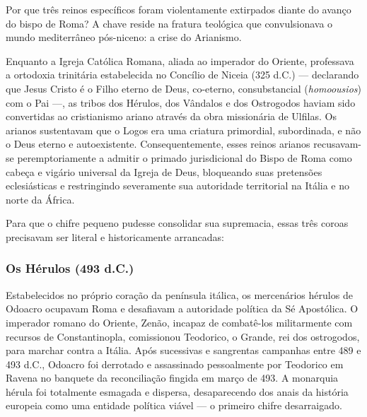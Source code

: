 \documentclass[11pt,a4paper,openany]{book}
\begin{document}
Por que três reinos específicos foram violentamente extirpados diante do avanço do bispo de Roma? A chave reside na fratura teológica que convulsionava o mundo mediterrâneo pós-niceno: a crise do Arianismo.

Enquanto a Igreja Católica Romana, aliada ao imperador do Oriente, professava a ortodoxia trinitária estabelecida no Concílio de Niceia (325 d.C.) — declarando que Jesus Cristo é o Filho eterno de Deus, co-eterno, consubstancial (\textit{homoousios}) com o Pai —, as tribos dos Hérulos, dos Vândalos e dos Ostrogodos haviam sido convertidas ao cristianismo ariano através da obra missionária de Ulfilas. Os arianos sustentavam que o Logos era uma criatura primordial, subordinada, e não o Deus eterno e autoexistente. Consequentemente, esses reinos arianos recusavam-se peremptoriamente a admitir o primado jurisdicional do Bispo de Roma como cabeça e vigário universal da Igreja de Deus, bloqueando suas pretensões eclesiásticas e restringindo severamente sua autoridade territorial na Itália e no norte da África.

Para que o chifre pequeno pudesse consolidar sua supremacia, essas três coroas precisavam ser literal e historicamente arrancadas:


\subsubsection*{Os Hérulos (493 d.C.)}
Estabelecidos no próprio coração da península itálica, os mercenários hérulos de Odoacro ocupavam Roma e desafiavam a autoridade política da Sé Apostólica. O imperador romano do Oriente, Zenão, incapaz de combatê-los militarmente com recursos de Constantinopla, comissionou Teodorico, o Grande, rei dos ostrogodos, para marchar contra a Itália. Após sucessivas e sangrentas campanhas entre 489 e 493 d.C., Odoacro foi derrotado e assassinado pessoalmente por Teodorico em Ravena no banquete da reconciliação fingida em março de 493. A monarquia hérula foi totalmente esmagada e dispersa, desaparecendo dos anais da história europeia como uma entidade política viável — o primeiro chifre desarraigado.
\end{document}
